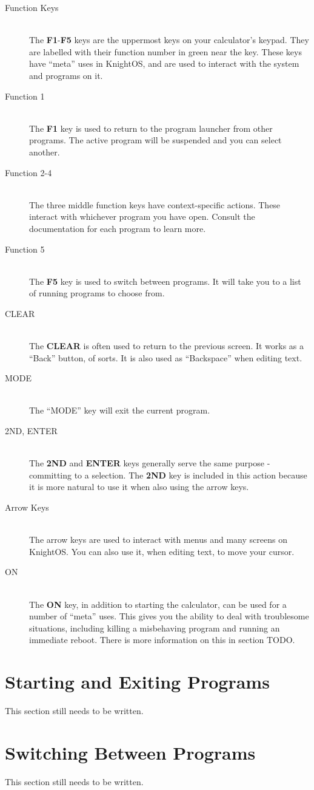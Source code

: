 \begin{description}
    \item[Function Keys] \hfill \\
        The \textbf{F1}-\textbf{F5} keys are the uppermost keys on your
        calculator's keypad. They are labelled with their function number in green
        near the key. These keys have ``meta'' uses in KnightOS, and are used to
        interact with the system and programs on it.
    \item[Function 1] \hfill \\
        The \textbf{F1} key is used to return to the program launcher from other
        programs.  The active program will be suspended and you can select
        another.
    \item[Function 2-4] \hfill \\
        The three middle function keys have context-specific actions. These
        interact with whichever program you have open. Consult the documentation
        for each program to learn more.
    \item[Function 5] \hfill \\
        The \textbf{F5} key is used to switch between programs. It will take you
        to a list of running programs to choose from.
    \item[CLEAR] \hfill \\
        The \textbf{CLEAR} is often used to return to the previous screen. It
        works as a ``Back'' button, of sorts. It is also used as ``Backspace''
        when editing text.
    \item[MODE] \hfill  \\
        The ``MODE'' key will exit the current program.
    \item[2ND, ENTER] \hfill \\
        The \textbf{2ND} and \textbf{ENTER} keys generally serve the same purpose
        - committing to a selection. The \textbf{2ND} key is included in this
        action because it is more natural to use it when also using the arrow
        keys.
    \item[Arrow Keys] \hfill \\
        The arrow keys are used to interact with menus and many screens on
        KnightOS. You can also use it, when editing text, to move your cursor.
    \item[ON] \hfill \\
        The \textbf{ON} key, in addition to starting the calculator, can be used
        for a number of ``meta'' uses. This gives you the ability to deal with
        troublesome situations, including killing a misbehaving program and
        running an immediate reboot. There is more information on this in section
        TODO.
\end{description}

\section{Starting and Exiting Programs}

This section still needs to be written.

\section{Switching Between Programs}

This section still needs to be written.
